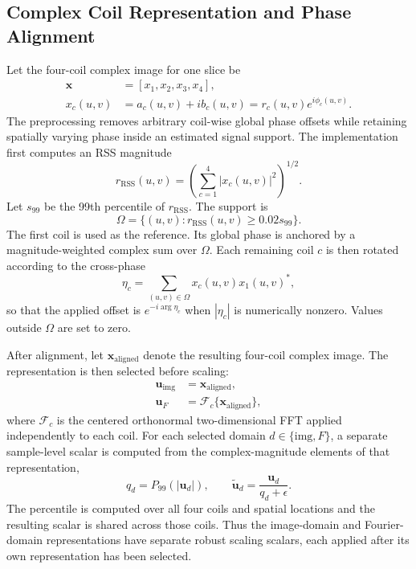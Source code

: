 \subsection{Complex Coil Representation and Phase Alignment}
Let the four-coil complex image for one slice be
\begin{align}
\mathbf{x} &= [x_1,x_2,x_3,x_4],\\
x_c(u,v) &= a_c(u,v)+ib_c(u,v)=r_c(u,v)e^{i\phi_c(u,v)}.
\end{align}
The preprocessing removes arbitrary coil-wise global phase offsets while retaining spatially varying phase inside an estimated signal support. The implementation first computes an \ac{RSS} magnitude
\begin{equation}
r_{\mathrm{RSS}}(u,v)=\left(\sum_{c=1}^{4}|x_c(u,v)|^2\right)^{1/2}.
\end{equation}
Let $s_{99}$ be the 99th percentile of $r_{\mathrm{RSS}}$. The support is
\begin{equation}
\Omega=\{(u,v):r_{\mathrm{RSS}}(u,v)\ge 0.02s_{99}\}.
\label{eq:support}
\end{equation}
The first coil is used as the reference. Its global phase is anchored by a magnitude-weighted complex sum over $\Omega$. Each remaining coil $c$ is then rotated according to the cross-phase
\begin{equation}
\eta_c=\sum_{(u,v)\in\Omega}x_c(u,v)x_1(u,v)^*,
\end{equation}
so that the applied offset is $e^{-i\arg\eta_c}$ when $|\eta_c|$ is numerically nonzero. Values outside $\Omega$ are set to zero.

After alignment, let $\mathbf{x}_{\mathrm{aligned}}$ denote the resulting four-coil complex image. The representation is then selected before scaling:
\begin{align}
\mathbf{u}_{\mathrm{img}} &= \mathbf{x}_{\mathrm{aligned}},\\
\mathbf{u}_{F} &= \mathcal{F}_{c}\{\mathbf{x}_{\mathrm{aligned}}\},
\end{align}
where $\mathcal{F}_{c}$ is the centered orthonormal two-dimensional FFT applied independently to each coil. For each selected domain $d\in\{\mathrm{img},F\}$, a separate sample-level scalar is computed from the complex-magnitude elements of that representation,
\begin{equation}
q_d=P_{99}\!\left(|\mathbf{u}_d|\right),\qquad
\widetilde{\mathbf{u}}_d=\frac{\mathbf{u}_d}{q_d+\epsilon}.
\label{eq:representation-scale}
\end{equation}
The percentile is computed over all four coils and spatial locations and the resulting scalar is shared across those coils. Thus the image-domain and Fourier-domain representations have separate robust scaling scalars, each applied after its own representation has been selected.

